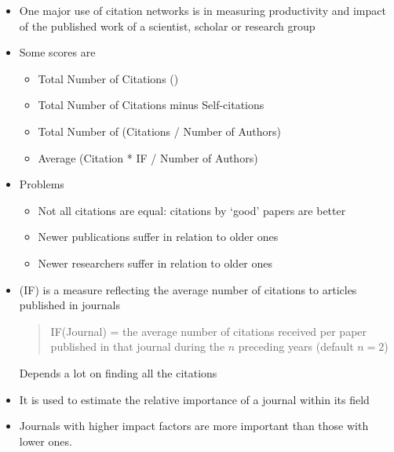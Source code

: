 \documentclass[a4paper,landscape,headrule,footrule,xetex]{foils}
\begin{document}

\begin{itemize}
\item One major use of citation networks is in measuring productivity
  and impact of the published work of a scientist, scholar or research
  group
\item Some scores are
  \begin{itemize}
  \item Total Number of Citations \hfill ()
  \item Total Number of Citations minus Self-citations
  \item Total Number of (Citations / Number of Authors)
  \item Average (Citation * IF / Number of Authors)
  \end{itemize}
\item Problems
  \begin{itemize}
  \item Not all citations are equal: citations by `good' papers are better
  \item Newer publications suffer in relation to older ones
  \item Newer researchers suffer in relation to older ones
  \end{itemize}
\end{itemize}



\begin{itemize}
\item (IF) is a measure reflecting the average number of citations to
  articles published in journals
  \begin{quote}
IF(Journal) = the average number of citations received per paper published in that journal during the $n$ preceding years (default $n = 2$)
  \end{quote}
  Depends a lot on finding all the citations

\item It is used to estimate the relative importance of a journal within its field
\item Journals with higher impact factors are more important than those with lower ones.
\end{itemize}

\end{document}
